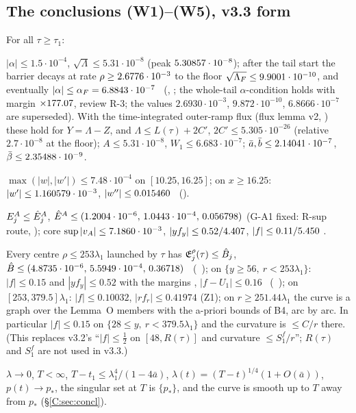 \documentclass[11pt]{article}
\begin{document}
\subsection{The conclusions (W1)--(W5), v3.3 form}\label{C:sec:W}
For all $\tau\ge\tau_1$:
\begin{description}[leftmargin=1.2em]
\item[(W1) trapping] $|\alpha|\le1.5\cdot10^{-4}$, $\sqrt\Lambda\le5.31\cdot10^{-8}$ (peak $5.30857\cdot10^{-8}$); after the tail start the barrier decays at rate $\rho\ge2.6776\cdot10^{-3}$ to the floor $\sqrt{\Lambda_F}\le9.9001\cdot10^{-10}$, and eventually $|\alpha|\le\alpha_F=6.8843\cdot10^{-7}$ \tC\ (\SV, ; the whole-tail $\alpha$-condition holds with margin $\times177.07$, review R-3; the  values $2.6930\cdot10^{-3}$, $9.872\cdot10^{-10}$, $6.8666\cdot10^{-7}$ are superseded). With the time-integrated outer-ramp flux (flux lemma v2, ) these hold for $Y=\Lambda-Z$, and $\Lambda\le L(\tau)+2C'$, $2C'\le5.305\cdot10^{-26}$ (relative $2.7\cdot10^{-8}$ at the floor); $A\le5.31\cdot10^{-8}$, $W_1\le6.683\cdot10^{-7}$; $\bar a,\bar b\le2.14041\cdot10^{-7}$, $\bar\beta\le2.35488\cdot10^{-9}$.
\item[(W2) tip] $\max(|w|,|w'|)\le7.48\cdot10^{-4}$ on $[10.25,16.25]$; on $x\ge16.25$: $|w'|\le1.160579\cdot10^{-3}$, $|w''|\le0.015460$ \tC\ (\SV).
\item[(W3) shells] $E^A_j\le\hat E^A_j$, $\hat E^A\le(1.2004\cdot10^{-6},\,1.0443\cdot10^{-4},\,0.056798)$ (G-A1 fixed: R-sup route, ); core $\sup|v_A|\le7.1860\cdot10^{-3}$, $|yf_y|\le0.52/4.407$, $|f|\le0.11/5.450$ \tC\tB.
\item[(W4) far field] Every centre $\rho\le253\lambda_1$ launched by $\tau$ has $\mathfrak E^\rho_j(\tau)\le\hat B_j$, $\hat B\le(4.8735\cdot10^{-6},\,5.5949\cdot10^{-4},\,0.36718)$ \tC\ (\SU\ ); on $\{y\ge56,\ r<253\lambda_1\}$: $|f|\le0.15$ and $|yf_y|\le0.52$ with the margins \UmarV, $|f-U_1|\le0.16$ \tC\ (\SU\ ); on $[253,379.5]\lambda_1$: $|f|\le0.10032$, $|rf_r|\le0.41974$ (Z1); on $r\ge251.44\lambda_1$ the curve is a graph over the Lemma~O members with the a-priori bounds of B4, arc by arc. In particular $|f|\le0.15$ on $\{28\le y,\ r<379.5\lambda_1\}$ and the curvature is $\le C/r$ there. (This replaces v3.2's ``$|f|\le\frac12$ on $[48,R(\tau)]$ and curvature $\le S_1^f/r$''; $R(\tau)$ and $S_1^f$ are not used in v3.3.)
\item[(W5) consequences] $\lambda\to0$, $T<\infty$, $T-t_1\le\lambda_1^4/(1-4\bar a)$, $\lambda(t)=(T-t)^{1/4}(1+O(\bar a))$, $p(t)\to p_*$, the singular set at $T$ is $\{p_*\}$, and the curve is smooth up to $T$ away from $p_*$ (\S\ref{C:sec:concl}).
\end{description}
\end{document}
